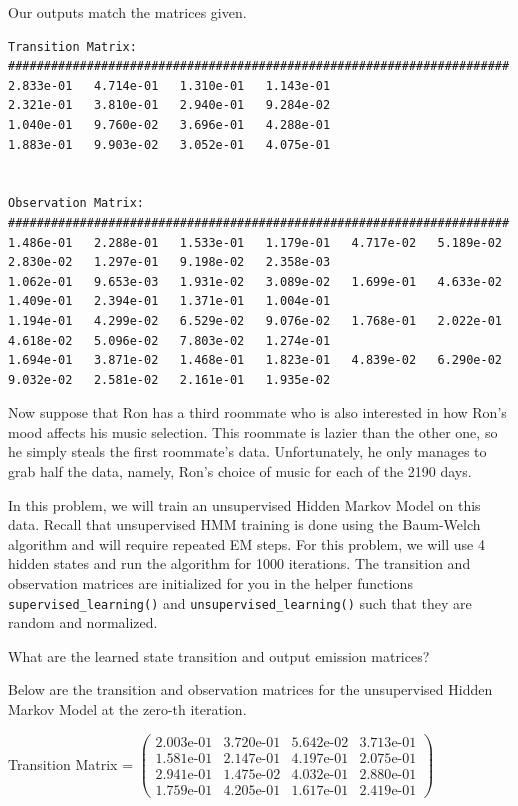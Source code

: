 \begin{solution}
  Our outputs match the matrices given.

  \begin{verbatim}
Transition Matrix:
######################################################################
2.833e-01   4.714e-01   1.310e-01   1.143e-01   
2.321e-01   3.810e-01   2.940e-01   9.284e-02   
1.040e-01   9.760e-02   3.696e-01   4.288e-01   
1.883e-01   9.903e-02   3.052e-01   4.075e-01   


Observation Matrix:  
######################################################################
1.486e-01   2.288e-01   1.533e-01   1.179e-01   4.717e-02   5.189e-02   2.830e-02   1.297e-01   9.198e-02   2.358e-03   
1.062e-01   9.653e-03   1.931e-02   3.089e-02   1.699e-01   4.633e-02   1.409e-01   2.394e-01   1.371e-01   1.004e-01   
1.194e-01   4.299e-02   6.529e-02   9.076e-02   1.768e-01   2.022e-01   4.618e-02   5.096e-02   7.803e-02   1.274e-01   
1.694e-01   3.871e-02   1.468e-01   1.823e-01   4.839e-02   6.290e-02   9.032e-02   2.581e-02   2.161e-01   1.935e-02
  \end{verbatim}
\end{solution}
\indent\problem[15] %
Now suppose that Ron has a third roommate who is also interested in how Ron's mood affects his music selection. This roommate is lazier than the other one, so he simply steals the first roommate's data. Unfortunately, he only manages to grab half the data, namely, Ron's choice of music for each of the 2190 days.

In this problem, we will train an unsupervised Hidden Markov Model on this data. Recall that unsupervised HMM training is done using the Baum-Welch algorithm and will require repeated EM steps. For this problem, we will use 4 hidden states and run the algorithm for 1000 iterations. The transition and observation matrices are initialized for you in the helper functions \texttt{supervised\_learning()} and \texttt{unsupervised\_learning()} such that they are random and normalized.

What are the learned state transition and output emission matrices?

Below are the transition and observation matrices for the unsupervised Hidden Markov Model at the zero-th iteration.

Transition Matrix = \small $\begin{pmatrix}
2.003\text{e-}01 & 3.720\text{e-}01 & 5.642\text{e-}02 & 3.713\text{e-}01\\
1.581\text{e-}01 & 2.147\text{e-}01 & 4.197\text{e-}01 & 2.075\text{e-}01\\
2.941\text{e-}01 & 1.475\text{e-}02 & 4.032\text{e-}01 & 2.880\text{e-}01\\
1.759\text{e-}01 & 4.205\text{e-}01 & 1.617\text{e-}01 & 2.419\text{e-}01 
\end{pmatrix}$
\normalsize

